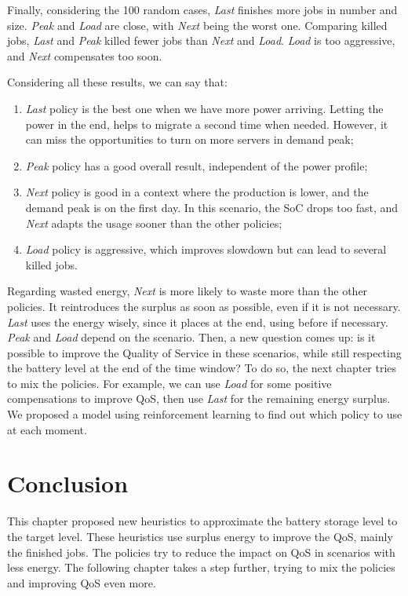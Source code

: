 Finally, considering the 100 random cases, \emph{Last} finishes more jobs in number and size. \emph{Peak} and \emph{Load} are close, with \emph{Next} being the worst one. Comparing killed jobs, \emph{Last} and \emph{Peak} killed fewer jobs than \emph{Next} and \emph{Load}. \emph{Load} is too aggressive, and \emph{Next} compensates too soon. 

Considering all these results, we can say that: 
\begin{enumerate}
    \item \emph{Last} policy is the best one when we have more power arriving. Letting the power in the end, helps to migrate a second time when needed. However, it can miss the opportunities to turn on more servers in demand peak;
    \item \emph{Peak} policy has a good overall result, independent of the power profile;
    \item \emph{Next} policy is good in a context where the production is lower, and the demand peak is on the first day. In this scenario, the SoC drops too fast, and \emph{Next} adapts the usage sooner than the other policies;
    \item \emph{Load} policy is aggressive, which improves slowdown but can lead to several killed jobs.
\end{enumerate}

Regarding wasted energy, \emph{Next} is more likely to waste more than the other policies. It reintroduces the surplus as soon as possible, even if it is not necessary. \emph{Last} uses the energy wisely, since it places at the end, using before if necessary. \emph{Peak} and \emph{Load} depend on the scenario. Then, a new question comes up: is it possible to improve the Quality of Service in these scenarios, while still respecting the battery level at the end of the time window? To do so, the next chapter tries to mix the policies. For example, we can use \emph{Load} for some positive compensations to improve QoS, then use \emph{Last} for the remaining energy surplus. We proposed a model using reinforcement learning to find out which policy to use at each moment.

\section{Conclusion}
This chapter proposed new heuristics to approximate the battery storage level to the target level. These heuristics use surplus energy to improve the QoS, mainly the finished jobs. The policies try to reduce the impact on QoS in scenarios with less energy. The following chapter takes a step further, trying to mix the policies and improving QoS even more.